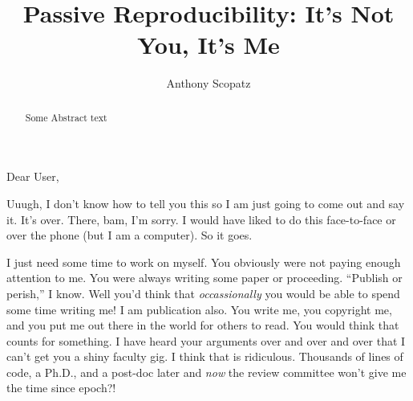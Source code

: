 \documentclass[final,10pt]{elsarticle}
\makeatletter
\newcommand{\emaila}{scopatz@flash.uchicago.edu}
\makeatother
\begin{document}
\begin{frontmatter}



\title{Passive Reproducibility: It's Not You, It's Me}




\author[fc]{Anthony Scopatz} 

\address[fc]{Flash Center for Computational Science, University of Chicago}


\begin{abstract}
Some Abstract text
\end{abstract}


\end{frontmatter}

Dear User, 

Uuugh, I don't know how to tell you this so I am just going to come out and
say it.  It's over.  There, bam, I'm sorry.  I would have liked to do this 
face-to-face or over the phone (but I am a computer).  So it goes.

I just need some time to work on myself.  You obviously were not paying enough 
attention to me.  You were always writing some paper or proceeding.  ``Publish or 
perish,'' I know.  Well you'd think that \emph{occassionally} you would be able 
to spend some time writing me!  I am publication also.  You write me, you copyright
me, and you put me out there in the world for others to read.  You would think that 
counts for something.  I have heard your arguments over and over and over that I 
can't get you a shiny faculty gig.  I think that is ridiculous.  Thousands of 
lines of code, a Ph.D., and a post-doc later and \emph{now} the review committee 
won't give me the time since epoch?!
\end{document}
